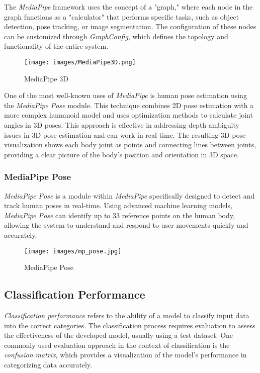 The \emph{MediaPipe} framework uses the concept of a "graph," where each node in the graph functions as a "calculator" that performs specific tasks, such as object detection, pose tracking, or image segmentation. The configuration of these nodes can be customized through \emph{GraphConfig}, which defines the topology and functionality of the entire system.

\begin{figure}[H]
  \centering
  \texttt{[image: images/MediaPipe3D.png]}
  \caption{MediaPipe 3D}
  \label{fig:MediaPipe3D}
\end{figure}

One of the most well-known uses of \emph{MediaPipe} is human pose estimation using the \emph{MediaPipe Pose} module. This technique combines 2D pose estimation with a more complex humanoid model and uses optimization methods to calculate joint angles in 3D poses. This approach is effective in addressing depth ambiguity issues in 3D pose estimation and can work in real-time. The resulting 3D pose visualization shows each body joint as points and connecting lines between joints, providing a clear picture of the body's position and orientation in 3D space.

\subsubsection{MediaPipe Pose}
\label{subsubsec:MediaPipe Pose}

\emph{MediaPipe Pose} is a module within \emph{MediaPipe} specifically designed to detect and track human poses in real-time. Using advanced machine learning models, \emph{MediaPipe Pose} can identify up to 33 reference points on the human body, allowing the system to understand and respond to user movements quickly and accurately.

\begin{figure}[H]
  \centering
  \texttt{[image: images/mp\_pose.jpg]}
  \caption{MediaPipe Pose}
  \label{fig:mp_pose}
\end{figure}

\subsection{Classification Performance}
\label{subsec:Classification Performance}

\emph{Classification performance} refers to the ability of a model to classify input data into the correct categories. The classification process requires evaluation to assess the effectiveness of the developed model, usually using a test dataset. One commonly used evaluation approach in the context of classification is the \emph{confusion matrix}, which provides a visualization of the model's performance in categorizing data accurately.

